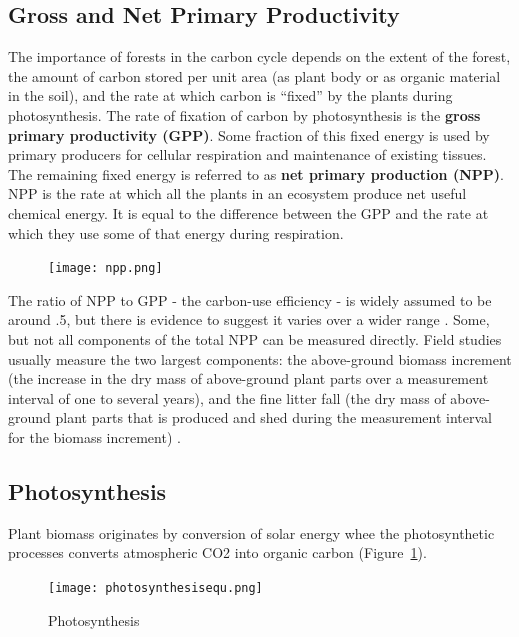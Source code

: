 \subsection{Gross and Net Primary Productivity}

The importance of forests in the carbon cycle depends on the extent of the forest, the amount of carbon stored per unit area (as plant body or as organic material in the soil), and the rate at which carbon is ``fixed'' by the plants during photosynthesis. The rate of fixation of carbon by photosynthesis is the \textbf{gross primary productivity (GPP)}. Some fraction of this fixed energy is used by primary producers for cellular respiration and maintenance of existing tissues. The remaining fixed energy is referred to as \textbf{net primary production (NPP)}. NPP is the rate at which all the plants in an ecosystem produce net useful chemical energy. It is equal to the difference between the GPP and the rate at which they use some of that energy during respiration\citep{corlett2014ecology}. 

\begin{figure}[ht]
    \centering
        \texttt{[image: npp.png]}
    \end{figure}

The ratio of NPP to GPP - the carbon-use efficiency - is widely assumed to be around .5, but there is evidence to suggest it varies over a wider range \citep{delucia2007forest}. Some, but not all components of the total NPP can be measured directly. Field studies usually measure the two largest components: the above-ground biomass increment (the increase in the dry mass of above-ground plant parts over a measurement interval of one to several years), and the fine litter fall (the dry mass of above-ground plant parts that is produced and shed during the measurement interval for the biomass increment) \citep{ruimy1996turc}. 
  
\subsection{Photosynthesis}


Plant biomass originates by conversion of solar energy whee the photosynthetic processes converts atmospheric CO2 into organic carbon (Figure~\ref{fig:photosynthesis}).
 
   \begin{figure}[ht]
    \centering
        \texttt{[image: photosynthesisequ.png]}
				\caption{Photosynthesis}
				\label{fig:photosynthesis}
    \end{figure}
		
